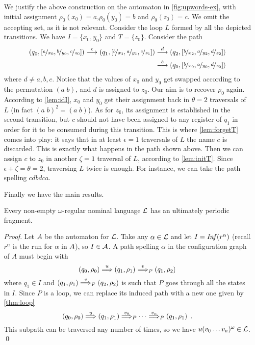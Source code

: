 \begin{example} We justify the above construction on the automaton in \cref{fig:upwords-ex}, with initial assignment $\rho_0(x_0) = a$,$\rho_0(y_0) = b$ and $\rho_0(z_0) = c$. We omit the accepting set, as it is not relevant. Consider the loop $L$ formed by all the depicted transitions.
We have $I = \{x_0,y_0\}$ and $T = \{z_0\}$. Consider the path
\begin{align*}
	(q_0,[\nicefrac{a}{x_0},\nicefrac{b}{y_0},\nicefrac{c}{z_0}]) \overset{c}{\longrightarrow} (q_1,[\nicefrac{b}{x_1},\nicefrac{a}{y_1},\nicefrac{c}{z_1}]) &\overset{d}{\longrightarrow} (q_2,[\nicefrac{b}{x_2},\nicefrac{a}{y_2},\nicefrac{d}{z_2}]) \\
	&\overset{b}{\longrightarrow} (q_0,[\nicefrac{b}{x_0},\nicefrac{a}{y_0},\nicefrac{d}{z_0}])
\end{align*}
where $d \neq a,b,c$. Notice that the values of $x_0$ and $y_0$ get swapped according to the permutation $(a \; b)$, and $d$ is assigned to $z_0$. Our aim is to recover $\rho_0$ again. According to \cref{lem:idI}, $x_0$ and $y_0$ get their assignment back in $\theta = 2$ traversals of $L$ (in fact $(a\; b)^2 = (a\; b)$). As for $z_0$, its assignment is established in the second transition, but $c$ should not have been assigned to any register of $q_1$ in order for it to be consumed during this transition. This is where \cref{lem:forgetT} comes into play: it says that in at least $\epsilon = 1$ traversals of $L$ the name $c$ is discarded. This is exactly what happens in the path shown above. Then we can assign $c$ to $z_0$ in another $\zeta = 1$ traversal of $L$, according to \cref{lem:initT}. Since $\epsilon + \zeta  = \theta = 2$, traversing $L$ twice is enough. For instance, we can take the path spelling $cdbdca$.
\end{example}


Finally we have the main results.
%
\begin{theorem}
\label{thm:up-fragment}
Every non-empty $\omega$-regular nominal language $\mathcal{L}$ has an ultimately periodic fragment.
\end{theorem}
\begin{proof}
Let $A$ be the automaton for $\mathcal{L}$. Take any $\alpha \in \mathcal{L}$ and let $I = \mathit{Inf}(r^\alpha)$ (recall $r^\alpha$ is the run for $\alpha$ in $A$), so $I \in \mathcal{A}$. A path spelling $\alpha$ in the configuration graph of $A$ must  begin with
\[
	(q_0,\rho_0) \overset{u}{\Longrightarrow} (q_1,\rho_1) \overset{v}{\Longrightarrow}_{P} (q_1,\rho_2)
\]
where $q_1 \in I$ and $(q_1,\rho_1) \overset{v}{\Longrightarrow}_{P} (q_2,\rho_2)$ is such that $P$ goes through all the states in $I$. Since $P$ is a loop, we can replace its induced path with a new one given by \cref{thm:loop} 
\[
	(q_0,\rho_0) \overset{u}{\Longrightarrow} (q_1,\rho_1) \overset{v_0}{\Longrightarrow}_{P} \cdots \overset{v_n}{\Longrightarrow}_{P} (q_1,\rho_1) \enspace .
\]
This subpath can be traversed any number of times, so we have $u(v_0\dots v_n)^\omega \in \mathcal{L}$.
\qed
\end{proof}

